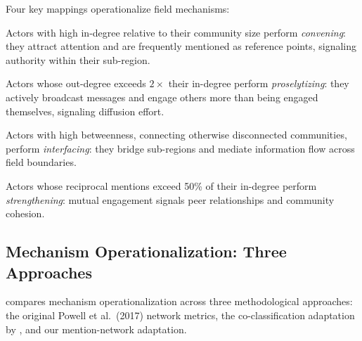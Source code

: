 \documentclass[../main.tex]{subfiles}
\begin{document}
Four key mappings operationalize field mechanisms:

\begin{description}[leftmargin=0.5cm, itemsep=0.3em]
\item[In-degree $\rightarrow$ Convening.]
Actors with high in-degree relative to their community size perform
\emph{convening}: they attract attention and are frequently mentioned
as reference points, signaling authority within their sub-region.

\item[Out-degree asymmetry $\rightarrow$ Proselytizing.]
Actors whose out-degree exceeds $2\times$ their in-degree perform
\emph{proselytizing}: they actively broadcast messages and engage
others more than being engaged themselves, signaling diffusion effort.

\item[Betweenness centrality $\rightarrow$ Interfacing.]
Actors with high betweenness, connecting otherwise disconnected
communities, perform \emph{interfacing}: they bridge sub-regions
and mediate information flow across field boundaries.

\item[Reciprocal mentions $\rightarrow$ Strengthening.]
Actors whose reciprocal mentions exceed 50\% of their in-degree
perform \emph{strengthening}: mutual engagement signals peer
relationships and community cohesion.
\end{description}

\subsection{Mechanism Operationalization: Three Approaches}

 compares mechanism operationalization
across three methodological approaches: the original Powell et al.\ (2017)
network metrics, the co-classification adaptation by
\textcite{benabdelkrim-opening-fields-2020}, and our mention-network adaptation.
\end{document}

